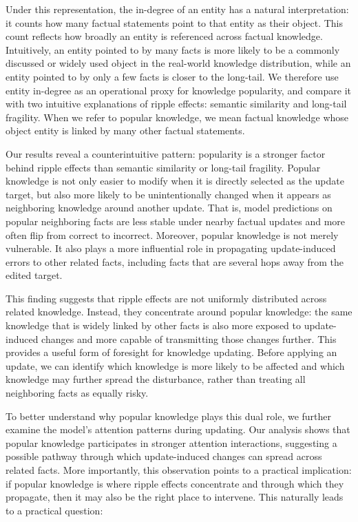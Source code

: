 Under this representation, the in-degree of an entity has a natural interpretation: it counts how many factual statements point to that entity as their object. 
This count reflects how broadly an entity is referenced across factual knowledge. 
Intuitively, an entity pointed to by many facts is more likely to be a commonly discussed or widely used object in the real-world knowledge distribution, while an entity pointed to by only a few facts is closer to the long-tail. 
We therefore use entity in-degree as an operational proxy for knowledge popularity, and compare it with two intuitive explanations of ripple effects: semantic similarity and long-tail fragility. 
When we refer to popular knowledge, we mean factual knowledge whose object entity is linked by many other factual statements.

Our results reveal a counterintuitive pattern: popularity is a stronger factor behind ripple effects than semantic similarity or long-tail fragility. 
Popular knowledge is not only easier to modify when it is directly selected as the update target, but also more likely to be unintentionally changed when it appears as neighboring knowledge around another update. 
That is, model predictions on popular neighboring facts are less stable under nearby factual updates and more often flip from correct to incorrect. 
Moreover, popular knowledge is not merely vulnerable. 
It also plays a more influential role in propagating update-induced errors to other related facts, including facts that are several hops away from the edited target.

This finding suggests that ripple effects are not uniformly distributed across related knowledge. 
Instead, they concentrate around popular knowledge: the same knowledge that is widely linked by other facts is also more exposed to update-induced changes and more capable of transmitting those changes further. 
This provides a useful form of foresight for knowledge updating. 
Before applying an update, we can identify which knowledge is more likely to be affected and which knowledge may further spread the disturbance, rather than treating all neighboring facts as equally risky.

To better understand why popular knowledge plays this dual role, we further examine the model's attention patterns during updating. 
Our analysis shows that popular knowledge participates in stronger attention interactions, suggesting a possible pathway through which update-induced changes can spread across related facts. 
More importantly, this observation points to a practical implication: if popular knowledge is where ripple effects concentrate and through which they propagate, then it may also be the right place to intervene. 
This naturally leads to a practical question:

